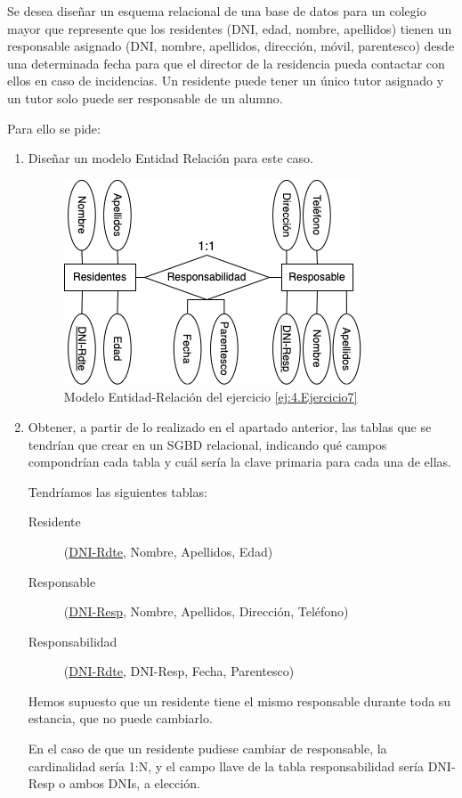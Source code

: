 \newpage
\begin{ejercicio}\label{ej:4.Ejercicio7}
    Se desea diseñar un esquema relacional de una base de datos para un colegio mayor que represente que los residentes (DNI, edad, nombre, apellidos) tienen un responsable asignado (DNI, nombre, apellidos, dirección, móvil, parentesco) desde una determinada fecha para que el director de la residencia pueda contactar con ellos
    en caso de incidencias. Un residente puede tener un único tutor asignado y un tutor
    solo puede ser responsable de un alumno.

    Para ello se pide:
    \begin{enumerate}
        \item Diseñar un modelo Entidad Relación para este caso.

        \begin{figure}[H]
            \centering
            \includegraphics[width=0.5\linewidth]{Imagenes/Ejercicio 7.png}
            \caption{Modelo Entidad-Relación del ejercicio \ref{ej:4.Ejercicio7}}
            \label{fig:Ej7}
        \end{figure}

        \item Obtener, a partir de lo realizado en el apartado anterior, las tablas que se tendrían que crear en un SGBD relacional, indicando qué campos compondrían cada tabla y cuál sería la clave primaria para cada una de ellas.

        Tendríamos las siguientes tablas:
        \begin{description}
            \item [Residente] (\underline{DNI-Rdte}, Nombre, Apellidos, Edad)
            \item [Responsable] (\underline{DNI-Resp}, Nombre, Apellidos, Dirección, Teléfono)
            \item [Responsabilidad] (\underline{DNI-Rdte}, {DNI-Resp}, Fecha, Parentesco)
        \end{description}

        \begin{observacion}
            Hemos supuesto que un residente tiene el mismo responsable durante toda su estancia, que no puede cambiarlo.

            En el caso de que un residente pudiese cambiar de responsable, la cardinalidad sería 1:N, y el campo llave de la tabla responsabilidad sería 
            DNI-Resp o ambos DNIs, a elección.
        \end{observacion}
    \end{enumerate}

    

    


\end{ejercicio}